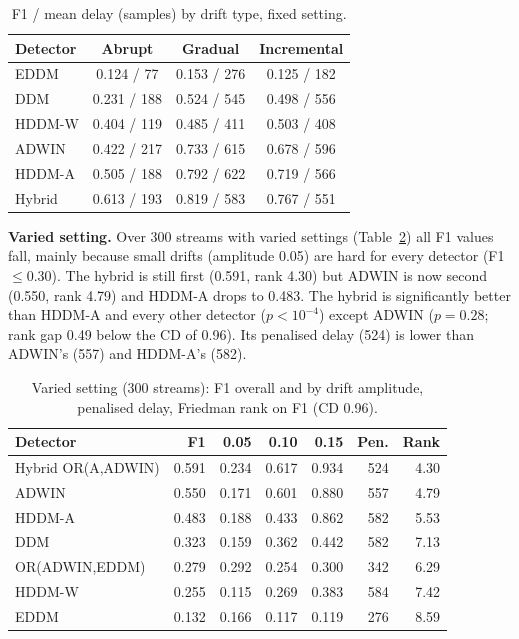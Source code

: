 \documentclass[conference]{IEEEtran}
\begin{document}
\begin{table}[t]
\caption{F1 / mean delay (samples) by drift type, fixed setting.}
\label{tab:kind}
\centering\small
\begin{tabular}{@{}lccc@{}}
\toprule
Detector & Abrupt & Gradual & Incremental\\
\midrule
EDDM & 0.124 / 77 & 0.153 / 276 & 0.125 / 182\\
DDM & 0.231 / 188 & 0.524 / 545 & 0.498 / 556\\
HDDM-W & 0.404 / 119 & 0.485 / 411 & 0.503 / 408\\
ADWIN & 0.422 / 217 & 0.733 / 615 & 0.678 / 596\\
HDDM-A & 0.505 / 188 & 0.792 / 622 & 0.719 / 566\\
Hybrid & 0.613 / 193 & 0.819 / 583 & 0.767 / 551\\
\bottomrule
\end{tabular}
\end{table}

\textbf{Varied setting.} Over 300 streams with varied settings (Table~\ref{tab:varied}) all F1 values fall, mainly because small drifts (amplitude 0.05) are hard for every detector (F1 $\le$0.30). The hybrid is still first (0.591, rank 4.30) but ADWIN is now second (0.550, rank 4.79) and HDDM-A drops to 0.483. The hybrid is significantly better than HDDM-A and every other detector ($p<10^{-4}$) except ADWIN ($p=0.28$; rank gap 0.49 below the CD of 0.96). Its penalised delay (524) is lower than ADWIN's (557) and HDDM-A's (582).

\begin{table}[t]
\caption{Varied setting (300 streams): F1 overall and by drift amplitude, penalised delay, Friedman rank on F1 (CD 0.96).}
\label{tab:varied}
\centering\footnotesize\setlength{\tabcolsep}{3pt}
\begin{tabular}{@{}lrrrrrr@{}}
\toprule
Detector & F1 & 0.05 & 0.10 & 0.15 & Pen. & Rank\\
\midrule
Hybrid OR(A,ADWIN) & 0.591 & 0.234 & 0.617 & 0.934 & 524 & 4.30\\
ADWIN & 0.550 & 0.171 & 0.601 & 0.880 & 557 & 4.79\\
HDDM-A & 0.483 & 0.188 & 0.433 & 0.862 & 582 & 5.53\\
DDM & 0.323 & 0.159 & 0.362 & 0.442 & 582 & 7.13\\
OR(ADWIN,EDDM) & 0.279 & 0.292 & 0.254 & 0.300 & 342 & 6.29\\
HDDM-W & 0.255 & 0.115 & 0.269 & 0.383 & 584 & 7.42\\
EDDM & 0.132 & 0.166 & 0.117 & 0.119 & 276 & 8.59\\
\bottomrule
\end{tabular}
\end{table}
\end{document}
